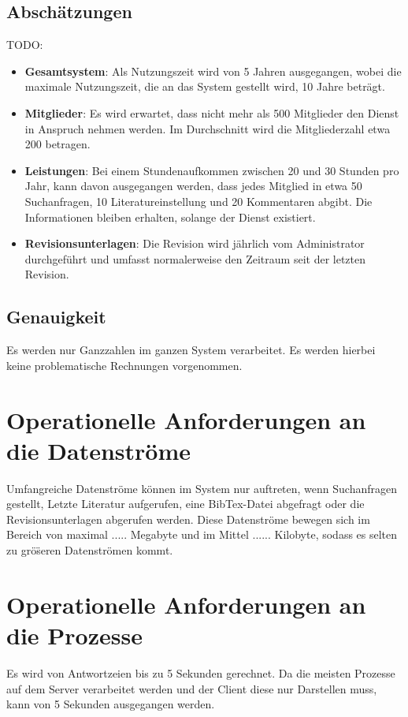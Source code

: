 \subsection{Abschätzungen}
TODO:
\begin{itemize}
 \item \textbf{Gesamtsystem}: Als Nutzungszeit wird von 5 Jahren ausgegangen, wobei die maximale Nutzungszeit, 
die an das System gestellt wird, 10 Jahre betr\"agt.
 \item \textbf{Mitglieder}: Es wird erwartet, dass nicht mehr als 500 Mitglieder den Dienst in Anspruch nehmen werden. Im Durchschnitt wird
 die Mitgliederzahl etwa 200 betragen.
\item \textbf{Leistungen}: Bei einem Stundenaufkommen zwischen 20 und 30 Stunden pro Jahr, kann davon ausgegangen werden, dass jedes 
Mitglied in etwa 50 Suchanfragen, 10 Literatureinstellung und 20 Kommentaren abgibt. Die Informationen bleiben erhalten, solange der Dienst existiert.  
 \item \textbf{Revisionsunterlagen}: Die Revision wird j\"ahrlich vom Administrator durchgef\"uhrt und umfasst normalerweise den Zeitraum seit der letzten Revision.  
\end{itemize}

\subsection{Genauigkeit}
Es werden nur Ganzzahlen im ganzen System verarbeitet. Es werden hierbei keine problematische Rechnungen vorgenommen.

\section{Operationelle Anforderungen an die Datenströme}
Umfangreiche Datenstr\"ome k\"onnen im System nur auftreten, wenn Suchanfragen gestellt, Letzte Literatur aufgerufen, eine BibTex-Datei abgefragt 
oder die Revisionsunterlagen abgerufen werden. Diese Datenstr\"ome bewegen sich im Bereich von maximal ..... Megabyte und im Mittel ...... Kilobyte, sodass es selten
zu gr\"o\"seren Datenstr\"omen kommt.


\section{Operationelle Anforderungen an die Prozesse}
Es wird von Antwortzeien bis zu 5 Sekunden gerechnet. Da die meisten Prozesse auf dem Server verarbeitet werden und der Client diese nur Darstellen muss, 
kann von 5 Sekunden ausgegangen werden. 

